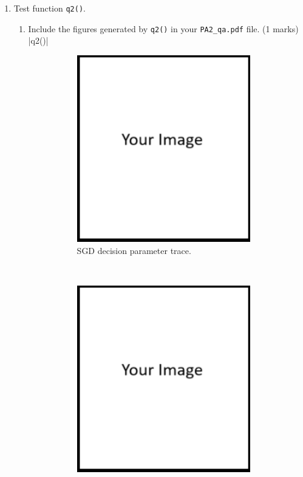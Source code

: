 \documentclass{article}
\theoremstyle{definition}
\newtheorem*{answer}{Answer}
\begin{document}
\begin{enumerate}[label=\ref{partsgd}.\alph*]
\begin{enumerate}[label=1.1.a.\roman*]
		\item  With learning rate $\eta=0.05$, what would be the value of $w_1$, \textit{i.e.}, after one iteration of SGD update. Show your mathematical process. If you implemented SGD correctly, the figures generated by \verb|q1()| should verify your $w_1$. (1 marks)
		\begin{answer}
			Your answer ...
		\end{answer}
	\end{enumerate}
	\newpage
	\item Test function \verb|q2()|.
	\begin{enumerate}[label=1.2.b.\roman*]
		\item Include the figures generated by \verb|q2()| in your \verb|PA2_qa.pdf| file. (1 marks)
			|q2()|
			\begin{figure}[h]
				\centering
				\begin{subfigure}[t]{0.5\textwidth}
					\centering
					\includegraphics[height=3.2in]{image.png}
					\caption{SGD decision parameter trace.}
				\end{subfigure}%
				~ 
				\begin{subfigure}[t]{0.5\textwidth}
					\centering
					\includegraphics[height=3.2in]{image.png}

\end{subfigure}
\end{figure}
\end{enumerate}
\end{enumerate}
\end{document}
